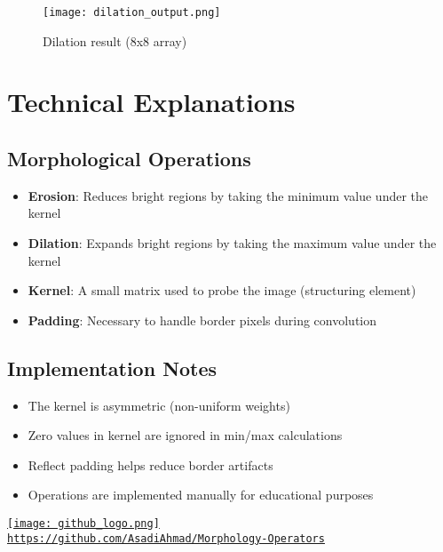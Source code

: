 \documentclass[12pt]{article}
\begin{document}
\begin{figure}[H]
    \centering
    \texttt{[image: dilation\_output.png]}
    \caption{Dilation result (8x8 array)}
    \label{fig:dilation}
\end{figure}

\section{Technical Explanations}

\subsection{Morphological Operations}
\begin{itemize}
    \item \textbf{Erosion}: Reduces bright regions by taking the minimum value under the kernel
    \item \textbf{Dilation}: Expands bright regions by taking the maximum value under the kernel
    \item \textbf{Kernel}: A small matrix used to probe the image (structuring element)
    \item \textbf{Padding}: Necessary to handle border pixels during convolution
\end{itemize}

\subsection{Implementation Notes}
\begin{itemize}
    \item The kernel is asymmetric (non-uniform weights)
    \item Zero values in kernel are ignored in min/max calculations
    \item Reflect padding helps reduce border artifacts
    \item Operations are implemented manually for educational purposes
\end{itemize}

\begin{center}
    \href{https://github.com/AsadiAhmad/Morphology-Operators}{
        \texttt{[image: github\_logo.png]} \\
        \texttt{https://github.com/AsadiAhmad/Morphology-Operators}
    }
\end{center}
\end{document}
